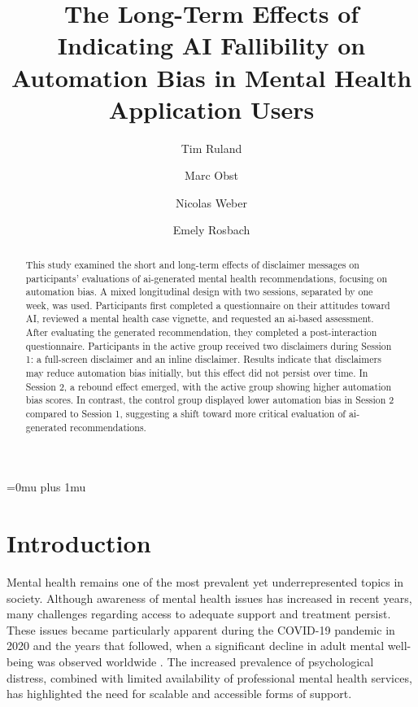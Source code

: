 \documentclass[sigconf,natbib=false]{acmart}
\title[AI Fallibility \& Automation Bias long-term Effects]{The Long-Term Effects of Indicating AI Fallibility on Automation Bias in Mental Health Application Users}
\author{Tim Ruland}
\author{Marc Obst}
\author{Nicolas Weber}
\affiliation{
  \institution{Technische Hochschule Ingolstadt}
  \city{Ingolstadt}
  \country{Germany}}
\author{Emely Rosbach}
\affiliation{
  \institution{Technische Hochschule Ingolstadt}
  \city{Ingolstadt}
  \country{Germany}}
\begin{document}
\hypersetup{
    hidelinks,
    breaklinks=true
}


\Urlmuskip=0mu plus 1mu\relax

\begin{abstract}
This study examined the short and long-term effects of disclaimer messages on participants’ evaluations of \gls{ai}-generated mental health recommendations, focusing on automation bias.
A mixed longitudinal design with two sessions, separated by one week, was used.
Participants first completed a questionnaire on their attitudes toward AI, reviewed a mental health case vignette, and requested an \gls{ai}-based assessment. After evaluating the generated recommendation, they completed a post-interaction questionnaire.
Participants in the active group received two disclaimers during Session 1: a full-screen disclaimer and an inline disclaimer.
Results indicate that disclaimers may reduce automation bias initially, but this effect did not persist over time. In Session 2, a rebound effect emerged, with the active group showing higher automation bias scores.
In contrast, the control group displayed lower automation bias in Session 2 compared to Session 1, suggesting a shift toward more critical evaluation of \gls{ai}-generated recommendations.
\end{abstract}




\maketitle


\section{Introduction}
Mental health remains one of the most prevalent yet underrepresented topics in society.
Although awareness of mental health issues has increased in recent years, many challenges regarding access to adequate support and treatment persist.
These issues became particularly apparent during the COVID-19 pandemic in 2020 and the years that followed, when a significant decline in adult mental well-being was observed worldwide \autocite[]{robert_koch_public_health_reporting}.
The increased prevalence of psychological distress, combined with limited availability of professional mental health services, has highlighted the need for scalable and accessible forms of support.
\end{document}
